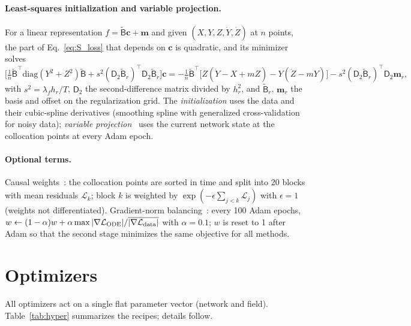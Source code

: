 \documentclass[aps,pra,onecolumn,superscriptaddress,11pt,longbibliography,floatfix,nofootinbib]{revtex4-2}
\begin{document}
\paragraph{Least-squares initialization and variable projection.} For a linear representation
$f=\tilde{\mathsf B}\bm c+\bm m$ and given $(X,Y,Z,\dot Y,\dot Z)$ at $n$ points, the part of
Eq.~\eqref{eq:S_loss} that depends on $\bm c$ is quadratic, and its minimizer solves
\begin{equation}
  \Big[\tfrac1n\tilde{\mathsf B}^{\top}\mathrm{diag}(Y^2+Z^2)\tilde{\mathsf B}
       +s^2(\mathsf D_2\tilde{\mathsf B}_r)^{\top}\mathsf D_2\tilde{\mathsf B}_r\Big]\bm c
  = -\tfrac1n\tilde{\mathsf B}^{\top}\big[Z(\dot Y-X+mZ)-Y(\dot Z-mY)\big]
    -s^2(\mathsf D_2\tilde{\mathsf B}_r)^{\top}\mathsf D_2\bm m_r ,
\end{equation}
with $s^2=\lambda_fh_r/T$, $\mathsf D_2$ the second-difference matrix divided by $h_r^2$, and
$\tilde{\mathsf B}_r$, $\bm m_r$ the basis and offset on the regularization grid.
The \emph{initialization} uses the data and their cubic-spline derivatives (smoothing spline with
generalized cross-validation for noisy data); \emph{variable projection}~\cite{golub1973varpro} uses the
current network state at the collocation points at every Adam epoch.

\paragraph{Optional terms.} Causal weights~\cite{wang2022causality}: the collocation points are sorted
in time and split into 20 blocks with mean residuals $\mathcal L_k$; block $k$ is weighted by
$\exp(-\epsilon\sum_{j<k}\mathcal L_j)$ with $\epsilon=1$ (weights not differentiated). Gradient-norm
balancing~\cite{wang2021gradient}: every 100 Adam epochs,
$w\leftarrow(1-\alpha)w+\alpha\max|\nabla\mathcal L_{\rm ODE}|/\overline{|\nabla\mathcal L_{\rm data}|}$
with $\alpha=0.1$; $w$ is reset to 1 after Adam so that the second stage minimizes the same objective
for all methods.

\section{Optimizers}\label{sec:optimizers}

All optimizers act on a single flat parameter vector (network and field). Table~\ref{tab:hyper}
summarizes the recipes; details follow.
\end{document}

